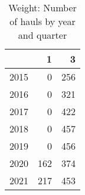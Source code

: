 \begin{table}[ht]
\centering
\begin{tabular}{rrr}
  \hline
 & 1 & 3 \\ 
  \hline
2015 & 0 & 256 \\ 
  2016 & 0 & 321 \\ 
  2017 & 0 & 422 \\ 
  2018 & 0 & 457 \\ 
  2019 & 0 & 456 \\ 
  2020 & 162 & 374 \\ 
  2021 & 217 & 453 \\ 
   \hline
\end{tabular}
\caption{Weight: Number of hauls by year and quarter} 
\end{table}
